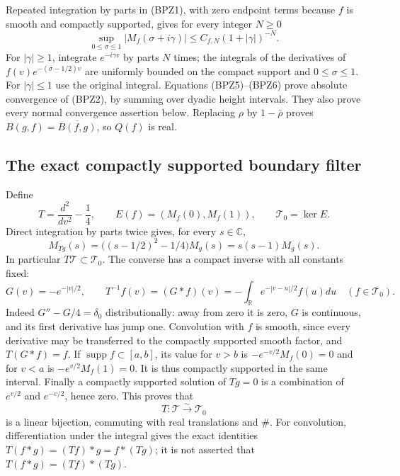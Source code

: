 Repeated integration by parts in (BPZ1), with zero endpoint terms
because $f$ is smooth and compactly supported, gives for every integer
$N\ge0$
\begin{equation}\tag{BPZ6}
 \sup_{0\le\sigma\le1}|M_f(\sigma+i\gamma)|
       \le C_{f,N}(1+|\gamma|)^{-N}.
\end{equation}
For $|\gamma|\ge1$, integrate $e^{-i\gamma v}$ by parts $N$ times;
the integrals of the derivatives of $f(v)e^{-(\sigma-1/2)v}$
are uniformly bounded on the compact support and $0\le\sigma\le1$.
For $|\gamma|\le1$ use the original integral. Equations (BPZ5)--(BPZ6)
prove absolute convergence of (BPZ2), by summing over dyadic height
intervals. They also prove every normal convergence assertion below.
Replacing $\rho$ by $1-\bar\rho$ proves
$B(g,f)=\overline{B(f,g)}$, so $Q(f)$ is real.

\subsection{The exact compactly supported boundary filter}

Define
\begin{equation}\tag{BPZ7}
 T=\frac{d^2}{dv^2}-\frac14,\qquad
 E(f)=(M_f(0),M_f(1)),\qquad \mathcal T_0=\ker E.
\end{equation}
Direct integration by parts twice gives, for every $s\in\mathbb C$,
\begin{equation}\tag{BPZ8}
 M_{Tg}(s)=\bigl((s-1/2)^2-1/4\bigr)M_g(s)
          =s(s-1)M_g(s).
\end{equation}
In particular $T\mathcal T\subset\mathcal T_0$.
The converse has a compact inverse with all constants fixed:
\begin{equation}\tag{BPZ9}
 G(v)=-e^{-|v|/2},\qquad
 T^{-1}f(v)=(G*f)(v)
      =-\int_{\mathbb R}e^{-|v-u|/2}f(u)du
                    \quad(f\in\mathcal T_0).
\end{equation}
Indeed $G''-G/4=\delta_0$ distributionally: away from zero it is
zero, $G$ is continuous, and its first derivative has jump one.
Convolution with $f$ is smooth, since every derivative may be
transferred to the compactly supported smooth factor, and $T(G*f)=f$.
If $\operatorname{supp} f\subset[a,b]$, its value for $v>b$ is
$-e^{-v/2}M_f(0)=0$ and for $v<a$ is $-e^{v/2}M_f(1)=0$.
It is thus compactly supported in the same interval.
Finally a compactly supported solution of $Tg=0$ is a combination
of $e^{v/2}$ and $e^{-v/2}$, hence zero. This proves that
\begin{equation}\tag{BPZ10}
 T:\mathcal T\xrightarrow{\sim}\mathcal T_0
\end{equation}
is a linear bijection, commuting with real translations and $\#$.
For convolution, differentiation under the integral gives the exact
identities $T(f*g)=(Tf)*g=f*(Tg)$; it is not asserted that
$T(f*g)=(Tf)*(Tg)$.

